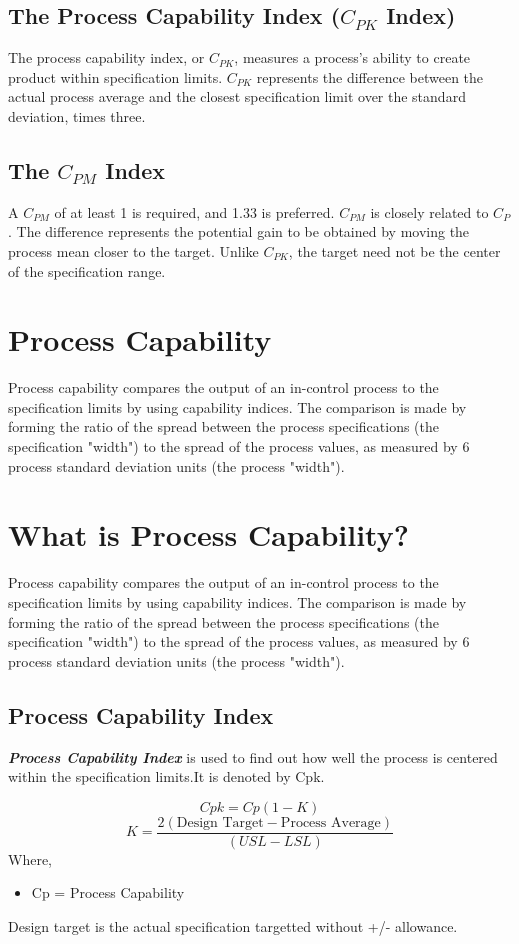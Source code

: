 \documentclass[11pt]{article} %
\begin{document}
\subsection*{The Process Capability Index ($C_{PK}$ Index)}
The process capability index, or $C_{PK}$, measures a process's ability to create product within specification limits. $C_{PK}$ represents the difference between the actual process average and the closest specification limit over the standard deviation, times three.

\subsection*{The $C_{PM}$ Index}

A $C_{PM}$ of at least 1 is required, and 1.33 is preferred. $C_{PM}$ is closely related to $C_{P}$. The difference represents the potential gain to be obtained by moving the process mean closer to the target. Unlike $C_{PK}$, the target need not be the center of the specification range.
\section{Process Capability}


Process capability compares the output of an in-control process to the specification limits by using capability indices. The comparison is made by forming the ratio of the spread between the process specifications (the specification "width") to the spread of the process values, as measured by 6 process standard deviation units (the process "width").
\section{What is Process Capability?}

Process capability compares the output of an in-control process to the specification limits by using capability indices. The comparison is made by forming the ratio of the spread between the process specifications (the specification "width") to the spread of the process values, as measured by 6 process standard deviation units (the process "width").

\subsection{Process Capability Index}

\textit{\textbf{Process Capability Index}} is used to find out how well the process is centered within the specification limits.It is denoted by Cpk.

\[Cpk = Cp(1-K)\]
\[K = \frac{2(\mbox{Design Target} - \mbox{Process Average})}{ (USL - LSL)}
\]
Where,

\begin{itemize}
	\item Cp = Process Capability
\end{itemize}

Design target is the actual specification targetted without +/- allowance.
\end{document}
